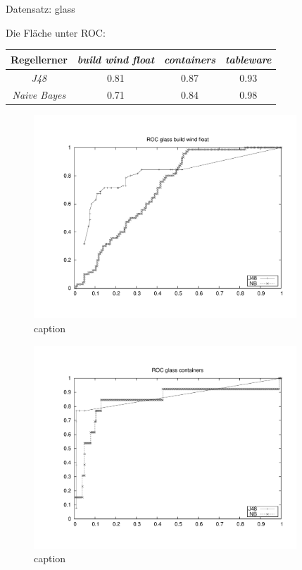 
Datensatz: glass

Die Fl\"ache unter ROC:

\begin{tabular}{c|c|c|c}
				Regellerner       & \emph{build wind float} & \emph{containers} & \emph{tableware}  \\ \hline
				\emph{J48}			& 0.81 & 0.87 & 0.93  \\ \hline
				\emph{Naive Bayes}  & 0.71 & 0.84 & 0.98  
\end{tabular}
\begin{figure}[htbp]
	\centering
		\includegraphics[height=3in]{pics/a3/ROC_glass_build_wind_float.pdf}
	\caption{caption}
	\label{fig:pics_a3_ROC_glass_build_wind_float}
\end{figure}

\begin{figure}[htbp]
	\centering
		\includegraphics[height=3in]{pics/a3/ROC_glass_containers.pdf}
	\caption{caption}
	\label{fig:pics_a3_ROC_glass_containers}
\end{figure}

